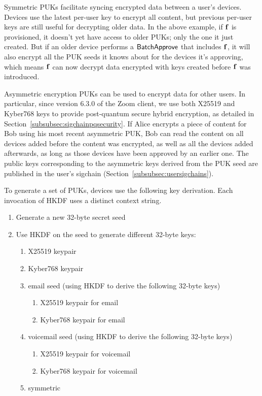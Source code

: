 Symmetric PUKs facilitate syncing encrypted data between a user's devices. Devices use the latest
per-user key to encrypt all content, but previous per-user keys are still useful for decrypting
older data. In the above example, if $\mathbf{f}$ is provisioned, it doesn't yet have access to older
PUKs; only the one it just created. But if an older device performs a $\mathsf{BatchApprove}{}$ that
includes $\mathbf{f}$, it will also encrypt all the PUK seeds it knows about for the devices it's
approving, which means $\mathbf{f}$ can now decrypt data encrypted with keys created before $\mathbf{f}$
was introduced.

Asymmetric encryption PUKs can be used to encrypt data for other users. In particular, since version
6.3.0 of the Zoom client, we use both X25519 and Kyber768 keys to provide post-quantum secure
hybrid encryption, as detailed in Section~\ref{subsubsec:sigchainpqsecurity}. If Alice encrypts a
piece of content for Bob using his most recent asymmetric PUK, Bob can read the content on all
devices added before the content was encrypted, as well as all the devices added afterwards, as long
as those devices have been approved by an earlier one. The public keys corresponding to the
asymmetric keys derived from the PUK seed are published in the user's sigchain
(Section~\ref{subsubsec:usersigchains}).

To generate a set of PUKs, devices use the following key derivation. Each invocation of HKDF
uses a distinct context string.

\begin{enumerate}
\item
Generate a new 32-byte secret seed
\item
Use HKDF on the seed to generate different 32-byte keys:
\begin{enumerate}
    \item X25519 keypair
    \item Kyber768 keypair
    \item email seed (using HKDF to derive the following 32-byte keys)
    \begin{enumerate}
        \item X25519 keypair for email
        \item Kyber768 keypair for email
    \end{enumerate}
    \item voicemail seed (using HKDF to derive the following 32-byte keys)
    \begin{enumerate}
        \item X25519 keypair for voicemail
        \item Kyber768 keypair for voicemail
    \end{enumerate}
    \item symmetric
\end{enumerate}
\end{enumerate}


